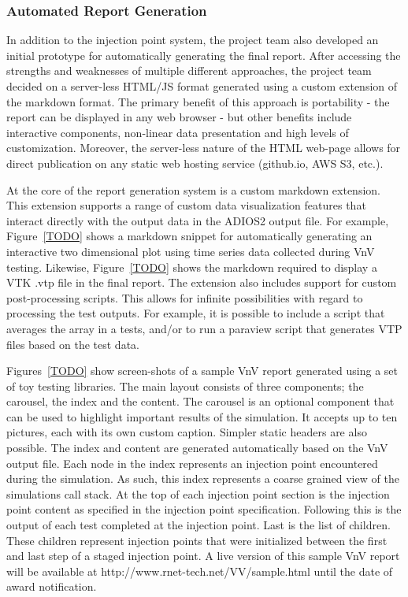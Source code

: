 \subsubsection{Automated Report Generation}

In addition to the injection point system, the project team also developed an initial prototype for automatically generating
the final report. After accessing the strengths and weaknesses of multiple different approaches, the project team
decided on a server-less HTML/JS format generated using a custom extension of the markdown format. The primary benefit of this approach is portability - the report can be displayed in any web browser - but other benefits include interactive components, non-linear data presentation and high levels of customization. Moreover, the server-less nature of the HTML web-page allows for direct publication on any static web hosting service (github.io, AWS S3, etc.). 

At the core of the report generation system is a custom markdown extension. This extension supports a range of custom data visualization features that interact directly with the output data in the ADIOS2 output file. For example, Figure~\ref{TODO} shows a markdown snippet for automatically generating an interactive two dimensional plot using time series data collected during VnV testing. Likewise, Figure~\ref{TODO} shows the markdown required to display a VTK .vtp file in the final report. The extension also includes support for custom post-processing scripts. This allows for infinite possibilities with regard to processing the test outputs. For example, it is possible to include a script that averages the array in a tests, and/or to run a paraview script that generates VTP files based on the test data. 

Figures~\ref{TODO} show screen-shots of a sample VnV report generated using a set of toy testing libraries. The main layout consists of three components; the carousel, the index and the content. The carousel is an optional component that can be used to highlight important results of the simulation. It accepts up to ten pictures, each with its own custom caption. Simpler static headers are also possible. The index and content are generated automatically based on the VnV output file. Each node in the index represents an injection point encountered during the simulation. As such, this index represents a coarse grained view of the simulations call stack. At the top of each injection point section is the injection point content as specified in the injection point specification. Following this is the output of each test completed at the injection point. Last is the list of children. These children represent injection points that were initialized between the first and last step of a staged injection point. A live version of this sample VnV report will be available at http://www.rnet-tech.net/VV/sample.html until the date of award notification. 

